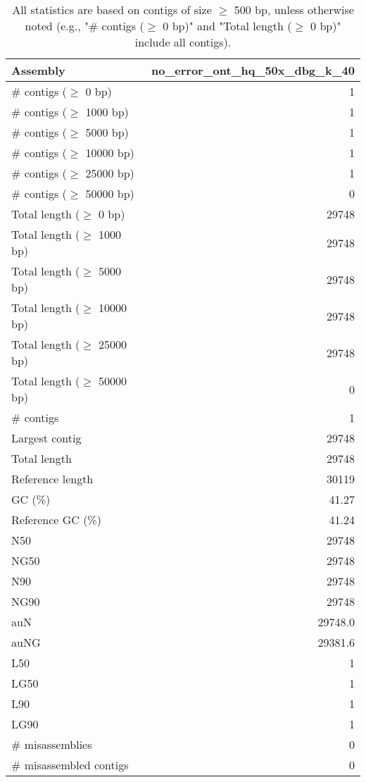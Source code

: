 \documentclass[12pt,a4paper]{article}
\begin{document}
\begin{table}[ht]
\begin{center}
\caption{All statistics are based on contigs of size $\geq$ 500 bp, unless otherwise noted (e.g., "\# contigs ($\geq$ 0 bp)" and "Total length ($\geq$ 0 bp)" include all contigs).}
\begin{tabular}{|l*{1}{|r}|}
\hline
Assembly & no\_error\_ont\_hq\_50x\_dbg\_k\_40 \\ \hline
\# contigs ($\geq$ 0 bp) & 1 \\ \hline
\# contigs ($\geq$ 1000 bp) & 1 \\ \hline
\# contigs ($\geq$ 5000 bp) & 1 \\ \hline
\# contigs ($\geq$ 10000 bp) & 1 \\ \hline
\# contigs ($\geq$ 25000 bp) & 1 \\ \hline
\# contigs ($\geq$ 50000 bp) & 0 \\ \hline
Total length ($\geq$ 0 bp) & 29748 \\ \hline
Total length ($\geq$ 1000 bp) & 29748 \\ \hline
Total length ($\geq$ 5000 bp) & 29748 \\ \hline
Total length ($\geq$ 10000 bp) & 29748 \\ \hline
Total length ($\geq$ 25000 bp) & 29748 \\ \hline
Total length ($\geq$ 50000 bp) & 0 \\ \hline
\# contigs & 1 \\ \hline
Largest contig & 29748 \\ \hline
Total length & 29748 \\ \hline
Reference length & 30119 \\ \hline
GC (\%) & 41.27 \\ \hline
Reference GC (\%) & 41.24 \\ \hline
N50 & 29748 \\ \hline
NG50 & 29748 \\ \hline
N90 & 29748 \\ \hline
NG90 & 29748 \\ \hline
auN & 29748.0 \\ \hline
auNG & 29381.6 \\ \hline
L50 & 1 \\ \hline
LG50 & 1 \\ \hline
L90 & 1 \\ \hline
LG90 & 1 \\ \hline
\# misassemblies & 0 \\ \hline
\# misassembled contigs & 0 \\ \hline

\end{tabular}
\end{center}
\end{table}
\end{document}
